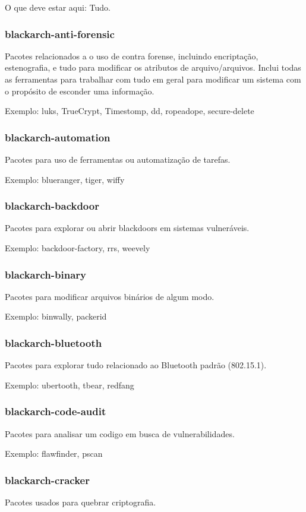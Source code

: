 \documentclass[a4paper, oneside, 11pt]{book}
\begin{document}
O que deve estar aqui: Tudo.

\subsubsection{blackarch-anti-forensic}
Pacotes relacionados a o uso de contra forense, incluindo encriptação, estenografia, e tudo para modificar os atributos de arquivo/arquivos.
Inclui todas as ferramentas para trabalhar com tudo em geral para modificar um sistema com o propósito de esconder uma informação.

Exemplo: luks, TrueCrypt, Timestomp, dd, ropeadope, secure-delete

\subsubsection{blackarch-automation}
Pacotes para uso de ferramentas ou automatização de tarefas.

Exemplo: blueranger, tiger, wiffy

\subsubsection{blackarch-backdoor}
Pacotes para explorar ou abrir blackdoors em sistemas vulneráveis.

Exemplo: backdoor-factory, rrs, weevely

\subsubsection{blackarch-binary}
Pacotes para modificar arquivos binários de algum modo.

Exemplo: binwally, packerid

\subsubsection{blackarch-bluetooth}
Pacotes para explorar tudo relacionado ao Bluetooth padrão (802.15.1).

Exemplo: ubertooth, tbear, redfang

\subsubsection{blackarch-code-audit}
Pacotes para analisar um codigo em busca de vulnerabilidades.

Exemplo: flawfinder, pscan

\subsubsection{blackarch-cracker}
Pacotes usados para quebrar criptografia.
\end{document}
